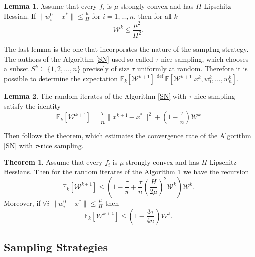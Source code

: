 \documentclass{article}
\theoremstyle{definition}
\theoremstyle{assumption}
\theoremstyle{lemma}
\newtheorem{lemma}{Lemma}
\theoremstyle{theorem}
\newtheorem{theorem}{Theorem}
\theoremstyle{proposition}
\begin{document}
	\begin{lemma}\label{lemma:2}
		Assume that every $f_i$ is $\mu$-strongly convex and has $H$-Lipschitz Hessian. If $\|w_i^0 - x^*\| \leqslant \frac{\mu}{H}$ for $i = 1, ..., n$, then for all $k$
		\begin{equation}
			\mathcal W^k \leqslant \frac{\mu^2}{H^2}.
		\end{equation}
	\end{lemma}

	The last lemma is the one that incorporates the nature of the sampling strategy. The authors of the Algorithm \ref{SN} used so called $\tau$-nice sampling, which chooses a subset $S^{k} \subseteq \{ 1, 2, ..., n \}$ precisely of size $\tau$ uniformly at random. Therefore it is possible to determine the expectation $\mathbb E_k[\mathcal W^{k+1}] \overset{\text{def}} = \mathbb E[\mathcal W^{k+1} | x^k, w_1^k, ..., w_n^k]$.

	\begin{lemma}\label{lemma:3}
		The random iterates of the Algorithm \ref{SN} with $\tau$-nice sampling satisfy the identity
		\begin{equation}
			\mathbb E_k[\mathcal W^{k+1}] = \frac{\tau}{n} \| x^{k+1} - x^* \|^2 + \left(1 - \frac{\tau}{n}\right) \mathcal W^k
		\end{equation}
	\end{lemma}

	Then follows the theorem, which estimates the convergence rate of the Algorithm \ref{SN} with $\tau$-nice sampling.
	
	\begin{theorem} \label{theorem:1}
		Assume that every $f_i$ is $\mu$-strongly convex and has $H$-Lipschitz Hessians. Then for the random iterates of the Algorithm 1 we have the recursion
		\begin{equation}
			\mathbb E_k[\mathcal W^{k+1}] \leqslant \left( 1 - \frac{\tau}{n} + \frac{\tau}{n} \left( \frac{H}{2\mu} \right)^2 \mathcal W^k \right) \mathcal W^k.
		\end{equation}
		Moreover, if $\forall i\ \|w_i^0 - x^*\| \leqslant \frac{\mu}{H}$ then
		\begin{equation}
			\mathbb E_k[\mathcal W^{k+1}] \leqslant \left( 1 - \frac{3\tau}{4n} \right) \mathcal W^k.
		\end{equation}
	\end{theorem}
	
	
	\subsection{Sampling Strategies}
	
\end{document}
